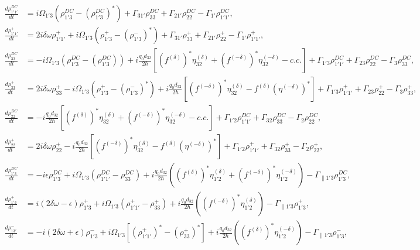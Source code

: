 \documentclass[]{spie}  %
\begin{document}
\begin{align}
\label{eq:temporal-hole-11}
\frac{d\rho_{1'1'}^{DC}}{dt} &= i\Omega_{1'3}(\rho_{1'3}^{DC}-(\rho_{1'3}^{DC})^*) +  \Gamma_{31'}\rho_{33}^{DC} + \Gamma_{21'}\rho_{22}^{DC}  -\Gamma_{1'}\rho_{1'1'}^{DC}, \\
\frac{d\rho_{1'1'}^{+}}{dt} &= 2i\delta\omega\rho_{1'1'}^{+} + i\Omega_{1'3}(\rho_{1'3}^{+}-(\rho_{1'3}^{-})^*) +  \Gamma_{31'}\rho_{33}^{+} + \Gamma_{21'}\rho_{22}^{+}  -\Gamma_{1'}\rho_{1'1'}^{+}, \\
\label{eq:temporal-hole-33}
\frac{d\rho_{33}^{DC}}{dt} &= -i\Omega_{1'3}(\rho_{1'3}^{DC}-(\rho_{1'3}^{DC})) + i\frac{q_0d_{32}}{2\hbar} \left [ ( f^{(\delta)})^*\eta_{32}^{(\delta)} +(f^{(-\delta)})^*\eta_{32}^{(-\delta)} -c.c.\right]
	+\Gamma_{1'3}\rho_{1'1'}^{DC} + \Gamma_{23}\rho_{22}^{DC} - \Gamma_3 \rho_{33}^{DC}, \\
\frac{d\rho_{33}^{+}}{dt} &= 2i\delta\omega\rho_{33}^{+} - i\Omega_{1'3}(\rho_{1'3}^{+}-(\rho_{1'3}^{-})^*) + i\frac{q_0d_{32}}{2\hbar} \left [ (f^{(-\delta)})^*\eta_{32}^{(\delta)} -f^{(\delta)}(\eta^{(-\delta)})^*\right]
	+\Gamma_{1'3}\rho_{1'1'}^{+} + \Gamma_{23}\rho_{22}^{+} - \Gamma_3 \rho_{33}^{+}, \\
\frac{d\rho_{22}^{DC}}{dt} &= -i\frac{q_0d_{32}}{2\hbar} \left [ ( f^{(\delta)})^*\eta_{32}^{(\delta)} +(f^{(-\delta)})^*\eta_{32}^{(-\delta)} -c.c.\right]
	+\Gamma_{1'2}\rho_{1'1'}^{DC} + \Gamma_{32}\rho_{33}^{DC} - \Gamma_2 \rho_{22}^{DC}, \\
\frac{d\rho_{22}^{+}}{dt} &= 2i\delta\omega\rho_{22}^{+} - i\frac{q_0d_{32}}{2\hbar} \left [ (f^{(-\delta)})^*\eta_{32}^{(\delta)} -f^{(\delta)}(\eta^{(-\delta)})^*\right]
	+\Gamma_{1'2}\rho_{1'1'}^{+} + \Gamma_{32}\rho_{33}^{+} - \Gamma_2 \rho_{22}^{+}, \\
\frac{d \rho_{1'3}^{DC}}{d t}  &= -i\epsilon\rho_{1'3}^{DC} +i \Omega_{1'3}(\rho_{1'1'}^{DC} - \rho_{33}^{DC}) +i\frac{q_0d_{32}}{2 \hbar}((f^{(\delta)})^*\eta_{1'2}^{(\delta)} +(f^{(-\delta)})^*\eta_{1'2}^{(-\delta)})
	-\Gamma_{\parallel 1'3} \rho_{1'3}^{DC},  \\
\frac{d \rho_{1'3}^{+}}{d t}  &= i(2\delta\omega-\epsilon)\rho_{1'3}^{+} +i \Omega_{1'3}(\rho_{1'1'}^{+} - \rho_{33}^{+}) +i\frac{q_0d_{32}}{2 \hbar}( (f^{(-\delta)})^*\eta_{1'2}^{(\delta)} )- \Gamma_{\parallel 1'3} \rho_{1'3}^{+},\\
\frac{d \rho_{13'}^{-}}{d t}  &= -i(2\delta\omega+\epsilon)\rho_{1'3}^{-} +i \Omega_{1'3}\left[(\rho_{1'1'}^{+})^* - (\rho_{33}^{+})^*\right] +i\frac{q_0d_{32}}{2 \hbar}( (f^{(\delta)})^*\eta_{1'2}^{(-\delta)} )- \Gamma_{\parallel 1'3} \rho_{1'3}^{-},  \\

\end{align}
\end{document}
